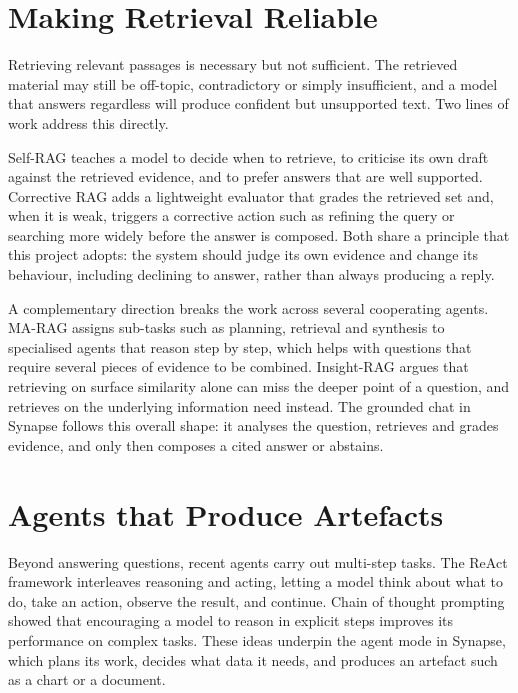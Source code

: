\section{Making Retrieval Reliable}

Retrieving relevant passages is necessary but not sufficient. The retrieved
material may still be off-topic, contradictory or simply insufficient, and a
model that answers regardless will produce confident but unsupported text. Two
lines of work address this directly.

Self-RAG \cite{asai2024selfrag} teaches a model to decide when to retrieve, to
criticise its own draft against the retrieved evidence, and to prefer answers
that are well supported. Corrective RAG \cite{yan2024crag} adds a lightweight
evaluator that grades the retrieved set and, when it is weak, triggers a
corrective action such as refining the query or searching more widely before the
answer is composed. Both share a principle that this project adopts: the system
should judge its own evidence and change its behaviour, including declining to
answer, rather than always producing a reply.

A complementary direction breaks the work across several cooperating agents.
MA-RAG \cite{nguyen2025marag} assigns sub-tasks such as planning, retrieval and
synthesis to specialised agents that reason step by step, which helps with
questions that require several pieces of evidence to be combined. Insight-RAG
\cite{pezeshkpour2025insightrag} argues that retrieving on surface similarity
alone can miss the deeper point of a question, and retrieves on the underlying
information need instead. The grounded chat in Synapse follows this overall
shape: it analyses the question, retrieves and grades evidence, and only then
composes a cited answer or abstains.

\section{Agents that Produce Artefacts}

Beyond answering questions, recent agents carry out multi-step tasks. The ReAct
framework \cite{yao2023react} interleaves reasoning and acting, letting a model
think about what to do, take an action, observe the result, and continue. Chain
of thought prompting \cite{wei2022cot} showed that encouraging a model to reason
in explicit steps improves its performance on complex tasks. These ideas underpin
the agent mode in Synapse, which plans its work, decides what data it needs, and
produces an artefact such as a chart or a document.

